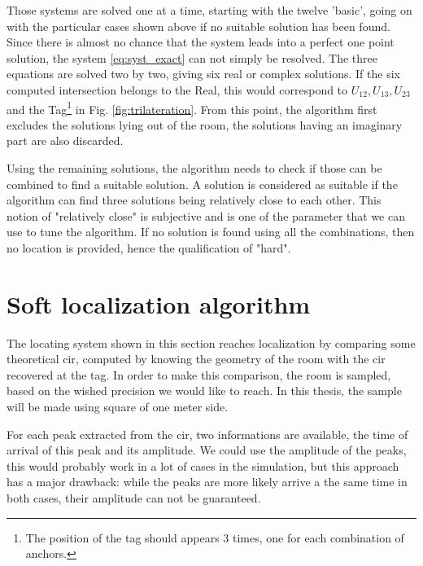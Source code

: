 Those systems are solved one at a time, starting with the twelve 'basic', going on with the particular cases shown above if no suitable solution has been found. Since there is almost no chance that the system leads into a perfect one point solution, the system \ref{eq:syst_exact} can not simply be resolved. The three equations are solved two by two, giving six real or complex solutions. If the six computed intersection belongs to the Real, this would correspond to $U_{12}, U_{13}, U_{23}$ and the Tag\footnote{The position of the tag should appears 3 times, one for each combination of anchors.} in Fig. \ref{fig:trilateration}. From this point, the algorithm first excludes the solutions lying out of the room, the solutions having an imaginary part are also discarded. 
\vspace{2mm}

Using the remaining solutions, the algorithm needs to check if those can be combined to find a suitable solution. A solution is considered as suitable if the algorithm can find three solutions being relatively close to each other. This notion of "relatively close" is subjective and is one of the parameter that we can use to tune the algorithm. If no solution is found using all the combinations, then no location is provided, hence the qualification of "hard".
\vspace{2mm}

\section{Soft localization algorithm}
\label{soft_loc}

The locating system shown in this section reaches localization by comparing some theoretical \gls{cir}, computed by knowing the geometry of the room with the \gls{cir} recovered at the tag. In order to make this comparison, the room is sampled, based on the wished precision we would like to reach. In this thesis, the sample will be made using square of one meter side.
\vspace{2mm}

For each peak extracted from the \gls{cir}, two informations are available, the time of arrival of this peak and its amplitude. We could use the amplitude of the peaks, this would probably work in a lot of cases in the simulation, but this approach has a major drawback: while the peaks are more likely arrive a the same time in both cases, their amplitude can not be guaranteed.
\vspace{2mm}


